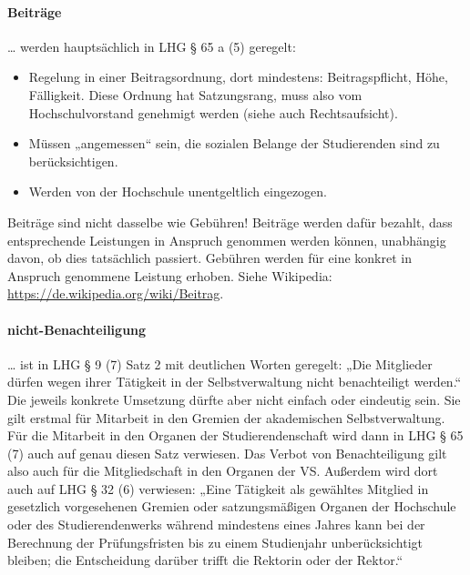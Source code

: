 \documentclass[
10pt,
a4paper,
twoside,								%
titlepage=false,							%
draft=false								%
]{scrartcl}
\begin{document}
\paragraph{Beiträge}

… werden hauptsächlich in LHG § 65 a (5) geregelt:
\begin{itemize}
	\item Regelung in einer Beitragsordnung, dort mindestens: Beitragspflicht, Höhe, Fälligkeit. Diese Ordnung hat Satzungsrang, muss also vom Hochschulvorstand genehmigt werden (siehe auch Rechtsaufsicht).
	\item Müssen „angemessen“ sein, die sozialen Belange der Studierenden sind zu berücksichtigen.
	\item Werden von der Hochschule unentgeltlich eingezogen.
\end{itemize}
Beiträge sind nicht dasselbe wie Gebühren! Beiträge werden dafür bezahlt, dass entsprechende Leistungen in Anspruch genommen werden können, unabhängig davon, ob dies tatsächlich passiert. Gebühren werden für eine konkret in Anspruch genommene Leistung erhoben. Siehe Wikipedia: \url{https://de.wikipedia.org/wiki/Beitrag}.



\paragraph{nicht-Benachteiligung}\label{Glossar: nicht-Benachteiligung}

… ist in LHG § 9 (7) Satz 2 mit deutlichen Worten geregelt: „Die Mitglieder dürfen wegen ihrer Tätigkeit in der Selbstverwaltung nicht benachteiligt werden.“ Die jeweils konkrete Umsetzung dürfte aber nicht einfach oder eindeutig sein. Sie gilt erstmal für Mitarbeit in den Gremien der akademischen Selbstverwaltung. Für die Mitarbeit in den Organen der Studierendenschaft wird dann in LHG § 65 (7) auch auf genau diesen Satz verwiesen. Das Verbot von Benachteiligung gilt also auch für die Mitgliedschaft in den Organen der VS. Außerdem wird dort auch auf LHG § 32 (6) verwiesen: „Eine Tätigkeit als gewähltes Mitglied in gesetzlich vorgesehenen Gremien oder satzungsmäßigen Organen der Hochschule oder des Studierendenwerks während mindestens eines Jahres kann bei der Berechnung der Prüfungsfristen bis zu einem Studienjahr unberücksichtigt bleiben; die Entscheidung darüber trifft die Rektorin oder der Rektor.“
\end{document}
